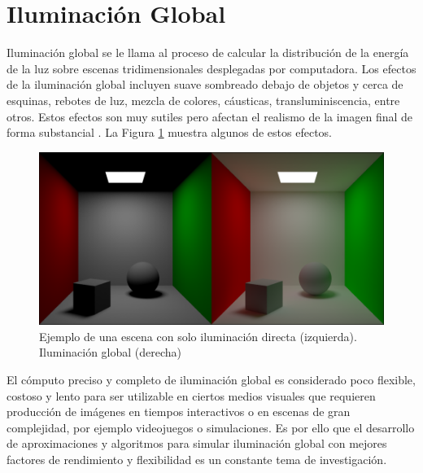 \section{Iluminación Global}

Iluminación global se le llama al proceso de calcular la distribución de la energía de la luz sobre escenas tridimensionales desplegadas por computadora. Los efectos de la iluminación global incluyen suave sombreado debajo de objetos y cerca de esquinas, rebotes de luz, mezcla de colores, cáusticas, transluminiscencia, entre otros. Estos efectos son muy sutiles pero afectan el realismo de la imagen final de forma substancial \cite{pixar_renderman_intro}. La Figura \ref{fig:gi_comparison} muestra algunos de estos efectos.

\begin{figure}[H]
	\centering
	\includegraphics[width=0.985\linewidth]{media/direct_vs_indirect.png}
	\caption{Ejemplo de una escena con solo iluminación directa (izquierda). Iluminación global (derecha)}
	\label{fig:gi_comparison}
\end{figure}

El cómputo preciso y completo de iluminación global es considerado poco flexible, costoso y lento para ser utilizable en ciertos medios visuales que requieren producción de imágenes en tiempos interactivos o en escenas de gran complejidad, por ejemplo videojuegos o simulaciones. Es por ello que el desarrollo de aproximaciones y algoritmos para simular iluminación global con mejores factores de rendimiento y flexibilidad es un constante tema de investigación.
